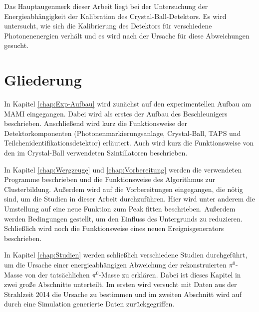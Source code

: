 \documentclass[a4paper,11pt,oneside,final,german,openbib,pdftex]{scrbook}
\begin{document}
{Das Hauptaugenmerk dieser Arbeit liegt bei der Untersuchung der Energieabh\"angigkeit der Kalibration des Crystal-Ball-Detektors. Es wird untersucht, wie sich die Kalibrierung des Detektors f\"ur verschiedene Photonenenergien verh\"alt und es wird nach der Ursache f\"ur diese Abweichungen gesucht. 
 
	
	
\section{Gliederung}

In Kapitel \ref{chap:Exp-Aufbau} wird zunächst auf den experimentellen Aufbau am MAMI eingegangen. Dabei wird als erstes der Aufbau des Beschleunigers beschrieben. Anschließend wird kurz die Funktionsweise der Detektorkomponenten (Photonenmarkierungsanlage, Crystal-Ball, TAPS und Teilchenidentifikationsdetektor) erl\"autert. Auch wird kurz die Funktionsweise von den im Crystal-Ball verwendeten Szintillatoren beschrieben.

In Kapitel \ref{chap:Wergzeuge} und \ref{chap:Vorbereitung} werden die verwendeten Programme beschrieben und die Funktionsweise des Algorithmus zur Clusterbildung. Außerdem wird auf die Vorbereitungen eingegangen, die nötig sind, um die Studien in dieser Arbeit durchzuführen. Hier wird unter anderem die Umstellung auf eine neue Funktion zum Peak fitten beschrieben. Außerdem werden Bedingungen gestellt, um den Einfluss des Untergrunds zu reduzieren. Schließlich wird noch die Funktionsweise eines neuen Ereignisgenerators beschrieben.

In Kapitel \ref{chap:Studien} werden schließlich verschiedene Studien durchgeführt, um die Ursache einer energieabhängigen Abweichung der rekonstruierten $\pi^0$-Masse von der tatsächlichen $\pi^0$-Masse zu erklären. Dabei ist dieses Kapitel in zwei große Abschnitte unterteilt. Im ersten wird versucht mit Daten aus der Strahlzeit 2014 die Ursache zu bestimmen und im zweiten Abschnitt wird auf durch eine Simulation generierte Daten zur\"uckgegriffen.

}
\end{document}
